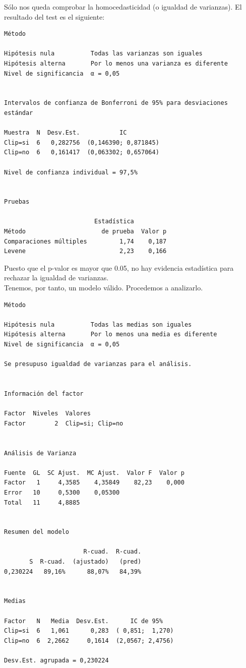 \documentclass[12pt,a4paper,twoside,openright,titlepage,final]{article}
\begin{document}
Sólo nos queda comprobar la homocedasticidad (o igualdad de varianzas). El resultado del test es el siguiente:

\begin{verbatim}
Método

Hipótesis nula          Todas las varianzas son iguales
Hipótesis alterna       Por lo menos una varianza es diferente
Nivel de significancia  α = 0,05


Intervalos de confianza de Bonferroni de 95% para desviaciones estándar

Muestra  N  Desv.Est.           IC
Clip=si  6   0,282756  (0,146390; 0,871845)
Clip=no  6   0,161417  (0,063302; 0,657064)

Nivel de confianza individual = 97,5%


Pruebas

                         Estadística
Método                     de prueba  Valor p
Comparaciones múltiples         1,74    0,187
Levene                          2,23    0,166

\end{verbatim}

Puesto que el p-valor es mayor que 0.05, no hay evidencia estadística para rechazar la igualdad de varianzas.\\

Tenemos, por tanto, un modelo válido. Procedemos a analizarlo.\\

\begin{verbatim}
Método

Hipótesis nula          Todas las medias son iguales
Hipótesis alterna       Por lo menos una media es diferente
Nivel de significancia  α = 0,05

Se presupuso igualdad de varianzas para el análisis.


Información del factor

Factor  Niveles  Valores
Factor        2  Clip=si; Clip=no


Análisis de Varianza

Fuente  GL  SC Ajust.  MC Ajust.  Valor F  Valor p
Factor   1     4,3585    4,35849    82,23    0,000
Error   10     0,5300    0,05300
Total   11     4,8885


Resumen del modelo

                      R-cuad.  R-cuad.
       S  R-cuad.  (ajustado)   (pred)
0,230224   89,16%      88,07%   84,39%


Medias

Factor   N   Media  Desv.Est.      IC de 95%
Clip=si  6   1,061      0,283  ( 0,851;  1,270)
Clip=no  6  2,2662     0,1614  (2,0567; 2,4756)

Desv.Est. agrupada = 0,230224

\end{verbatim}
\end{document}
